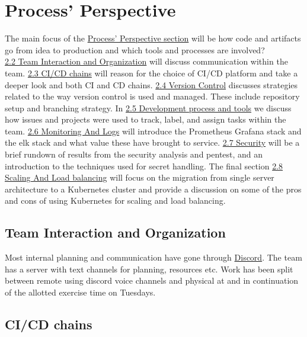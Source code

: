 \section{Process' Perspective}
\label{sec:processPerspective}

The main focus of the \hyperref[sec:processPerspective]{Process' Perspective section} will be how code and artifacts go from idea to production and which tools and processes are involved?\\
\hyperref[subsec:TeamInteraction]{2.2 Team Interaction and Organization} will discuss communication within the team. \hyperref[subsec:cicd]{2.3 CI/CD chains} will reason for the choice of CI/CD platform and take a deeper look and both CI and CD chains.
\hyperref[subsec:vs]{2.4 Version Control} discusses strategies related to the way version control is used and managed. These include repository setup and branching strategy. In 
\hyperref[subsec:process&tools]{2.5 Development process and tools} we discuss how issues and projects were used to track, label, and assign tasks within the team.
\hyperref[subsec:monitoring]{2.6 Monitoring And Logs} will introduce the Prometheus Grafana stack and the elk stack and what value these have brought to service.
\hyperref[subsec:security]{2.7 Security} will be a brief rundown of results from the security analysis and pentest, and an introduction to the techniques used for secret handling.
The final section \hyperref[subsec:scaling]{2.8 Scaling And Load balancing} will focus on the migration from single server architecture to a Kubernetes cluster and provide a discussion on some of the pros and cons of using Kubernetes for scaling and load balancing.

\subsection{Team Interaction and Organization}
\label{subsec:TeamInteraction}
Most internal planning and communication have gone through \href{https://discord.com/}{Discord}. The team has a server with text channels for planning, resources etc. Work has been split between remote using discord voice channels and physical at and in continuation of the allotted exercise time on Tuesdays.
\subsection{CI/CD chains}
\label{subsec:cicd}

